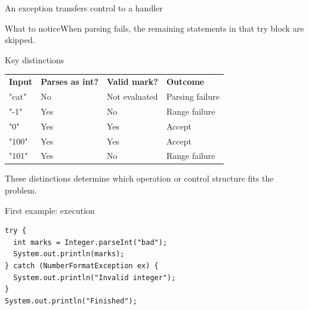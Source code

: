 \documentclass[10pt,aspectratio=169]{beamer}
\begin{document}
\begin{frame}[fragile,t]{An exception transfers control to a handler}
\begin{center}\end{center}
\begin{block}{What to notice}When parsing fails, the remaining statements in that try block are skipped.\end{block}
\end{frame}
\begin{frame}[fragile,t]{Key distinctions}
\small\renewcommand{\arraystretch}{1.5}
\begin{tabularx}{\textwidth}{>{\raggedright\arraybackslash}X>{\raggedright\arraybackslash}X>{\raggedright\arraybackslash}X>{\raggedright\arraybackslash}X}
\rowcolor{navy}
\color{white}\bfseries Input & \color{white}\bfseries Parses as int? & \color{white}\bfseries Valid mark? & \color{white}\bfseries Outcome\\
"cat" & No & Not evaluated & Parsing failure\\
"-1" & Yes & No & Range failure\\
"0" & Yes & Yes & Accept\\
"100" & Yes & Yes & Accept\\
"101" & Yes & No & Range failure\\
\end{tabularx}
\vspace{3mm}\footnotesize These distinctions determine which operation or control structure fits the problem.
\end{frame}

\begin{frame}[fragile,t]{First example: execution}
\begin{lstlisting}
try {
  int marks = Integer.parseInt("bad");
  System.out.println(marks);
} catch (NumberFormatException ex) {
  System.out.println("Invalid integer");
}
System.out.println("Finished");
\end{lstlisting}
\end{frame}
\end{document}
